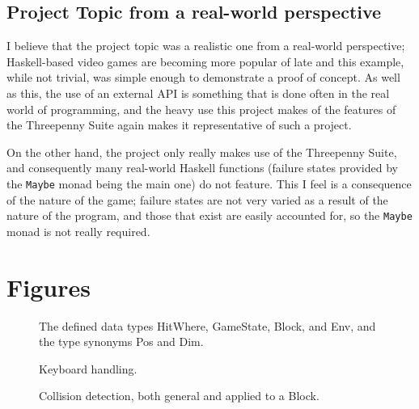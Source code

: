 \documentclass[12pt]{article}
\begin{document}
\subsection{Project Topic from a real-world perspective}

I believe that the project topic was a realistic one from a real-world perspective; Haskell-based video games are becoming more popular of late and this example, while not trivial, was simple enough to demonstrate a proof of concept.
As well as this, the use of an external API is something that is done often in the real world of programming, and the heavy use this project makes of the features of the Threepenny Suite again makes it representative of such a project.

\par

On the other hand, the project only really makes use of the Threepenny Suite, and consequently many real-world Haskell functions (failure states provided by the \verb|Maybe| monad being the main one) do not feature.
This I feel is a consequence of the nature of the game; failure states are not very varied as a result of the nature of the program, and those that exist are easily accounted for, so the \verb|Maybe| monad is not really required.

\pagebreak

\appendix

\section{Figures}

\begin{figure}[ht]
  \caption{The defined data types HitWhere, GameState, Block, and Env, and the type synonyms Pos and Dim.}
  
  \label{fig:datatypes}
\end{figure}

\begin{figure}[ht]
  \caption{Keyboard handling.}
  
  \label{fig:keyboardhandle}
\end{figure}

\begin{figure}[ht]
  \caption{Collision detection, both general and applied to a Block.}
  
  \label{fig:hitcheck}
\end{figure}
\end{document}
